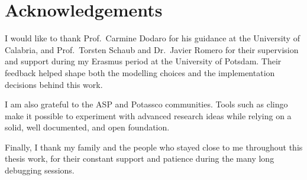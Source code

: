 \section*{Acknowledgements}

I would like to thank Prof.~Carmine Dodaro for his guidance at the University of Calabria, and Prof.~Torsten Schaub and Dr.~Javier Romero for their supervision and support during my Erasmus period at the University of Potsdam. Their feedback helped shape both the modelling choices and the implementation decisions behind this work.

I am also grateful to the ASP and Potassco communities. Tools such as clingo make it possible to experiment with advanced research ideas while relying on a solid, well documented, and open foundation.

Finally, I thank my family and the people who stayed close to me throughout this thesis work, for their constant support and patience during the many long debugging sessions.

